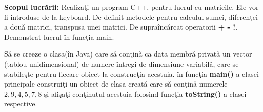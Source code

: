 \textbf{Scopul lucr\u{a}rii:} Realiza\c{t}i un program C++, pentru lucrul cu
matricile. Ele vor fi introduse de la keyboard. De definit metodele pentru
calculul sumei, diferen\c{t}ei a dou\v{a} matrici, transpusa unei matrici.
De supra\^{i}nc\v{a}rcat operatorii \textbf{+  - !}. Demonstrat lucrul \^{i}n func\c{t}ia main.

S\v{a} se creeze o clasa(\^{i}n Java) care s\v{a} con\c{t}in\v{a} ca data
membr\v{a} privat\v{a} un vector (tablou unidimensional) de numere \^{i}ntregi
de dimensiune variabil\v{a}, care se stabile\c{s}te pentru fiecare obiect
la construc\c{t}ia acestuia. \^{i}n func\c{t}ia \textbf{main()} a clasei 
principale construi\c{t}i un obiect de clasa creat\v{a} care s\v{a} con\c{t}in\v{a} numerele $2, 9, 4, 5, 7, 8$ \c{s}i afi\c{s}a\c{t}i con\c{t}inutul
acestuia folosind func\c{t}ia \textbf{toString()} a clasei respective.
